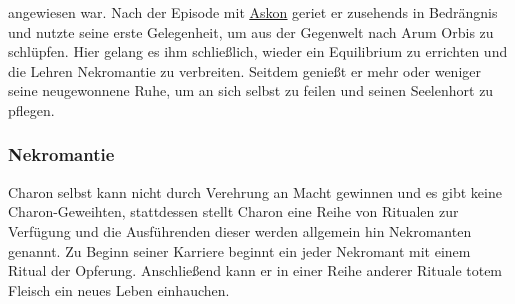 \documentclass[a4paper,12pt,oneside]{book}
\begin{document}
angewiesen war. Nach der Episode mit \uline{\hyperref[Askon]{Askon}} geriet er zusehends in Bedrängnis und nutzte seine erste Gelegenheit, um aus der Gegenwelt nach Arum Orbis zu schlüpfen. Hier gelang es ihm schließlich, wieder ein Equilibrium zu errichten und die Lehren Nekromantie zu verbreiten. Seitdem genießt er mehr oder weniger seine neugewonnene Ruhe, um an sich selbst zu feilen und seinen Seelenhort zu pflegen.
\subsubsection{Nekromantie}\label{Nekromantie}
Charon selbst kann nicht durch Verehrung an Macht gewinnen und es gibt keine Charon-Geweihten, stattdessen stellt Charon eine Reihe von Ritualen zur Verfügung und die Ausführenden dieser werden allgemein hin Nekromanten genannt. Zu Beginn seiner Karriere beginnt ein jeder Nekromant mit einem Ritual der Opferung. Anschließend kann er in einer Reihe anderer Rituale totem Fleisch ein neues Leben einhauchen.
\end{document}
